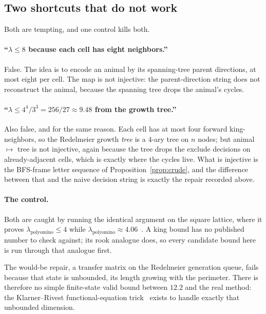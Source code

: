 \documentclass[11pt]{article}
\begin{document}
\subsection{Two shortcuts that do not work}
\label{sec:falsestarts}

Both are tempting, and one control kills both.

\paragraph{``$\lambda \le 8$ because each cell has eight neighbors.''} False.
The idea is to encode an animal by its spanning-tree parent directions, at most
eight per cell. The map is not injective: the parent-direction string does not
reconstruct the animal, because the spanning tree drops the animal's cycles.

\paragraph{``$\lambda \le 4^4/3^3 = 256/27 \approx 9.48$ from the growth tree.''}
Also false, and for the same reason. Each cell has at most four forward
king-neighbors, so the Redelmeier growth \emph{tree} is a $4$-ary tree on $n$
nodes; but animal $\mapsto$ tree is not injective, again because the tree drops
the exclude decisions on already-adjacent cells, which is exactly where the
cycles live. What is injective is the BFS-frame letter sequence of
Proposition~\ref{prop:crude}, and the difference between that and the naive
decision string is exactly the repair recorded above.

\paragraph{The control.} Both are caught by running the identical argument on
the square lattice, where it proves $\lambda_{\text{polyomino}} \le 4$ while
$\lambda_{\text{polyomino}} \approx 4.06$~\cite{barequetRoteShalah2016}. A king
bound has no published number to check against; its rook analogue does, so every
candidate bound here is run through that analogue first.

The would-be repair, a transfer matrix on the Redelmeier generation queue,
fails because that state is unbounded, its length growing with the perimeter.
There is therefore no simple finite-state valid bound between $12.2$ and the real
method: the Klarner--Rivest functional-equation
trick~\cite{klarnerRivest1973} exists to handle exactly that unbounded
dimension.
\end{document}
